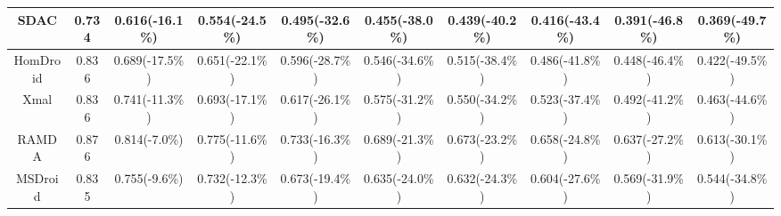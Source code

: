 \begin{table}[t]
\begin{adjustbox}{width=\textwidth}
\begin{tabular}{@{}c|c|c|c|c|c|c|c|c|c@{}}
            SDAC              & 0.734               & 0.616(-16.1\%)      & 0.554(-24.5\%)      & 0.495(-32.6\%)      & 0.455(-38.0\%)       & 0.439(-40.2\%)       & 0.416(-43.4\%)       & 0.391(-46.8\%)       & 0.369(-49.7\%)       \\ \midrule
            HomDroid          & 0.836               & 0.689(-17.5\%)      & 0.651(-22.1\%)      & 0.596(-28.7\%)      & 0.546(-34.6\%)       & 0.515(-38.4\%)       & 0.486(-41.8\%)       & 0.448(-46.4\%)       & 0.422(-49.5\%)       \\ \midrule
            Xmal              & 0.836               & 0.741(-11.3\%)      & 0.693(-17.1\%)      & 0.617(-26.1\%)      & 0.575(-31.2\%)       & 0.550(-34.2\%)       & 0.523(-37.4\%)       & 0.492(-41.2\%)       & 0.463(-44.6\%)       \\ \midrule
            RAMDA             & 0.876               & 0.814(-7.0\%)       & 0.775(-11.6\%)      & 0.733(-16.3\%)      & 0.689(-21.3\%)       & 0.673(-23.2\%)       & 0.658(-24.8\%)       & 0.637(-27.2\%)       & 0.613(-30.1\%)       \\ \midrule
            MSDroid           & 0.835               & 0.755(-9.6\%)       & 0.732(-12.3\%)      & 0.673(-19.4\%)      & 0.635(-24.0\%)       & 0.632(-24.3\%)       & 0.604(-27.6\%)       & 0.569(-31.9\%)       & 0.544(-34.8\%)       \\ \midrule \midrule


\end{tabular}
\end{adjustbox}
\end{table}
